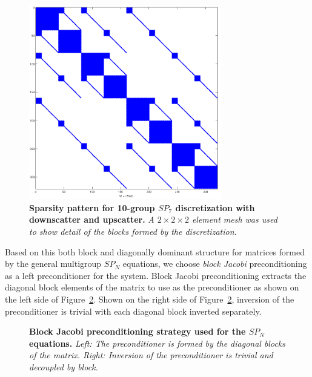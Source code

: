 \begin{figure}[t!]
  \begin{center}
    \includegraphics[width=3.3in]{chapters/spn_equations/group10us.png}
  \end{center}
  \caption{\textbf{Sparsity pattern for 10-group $SP_7$ discretization
      with downscatter and upscatter.} \textit{A $2\times 2 \times 2$ element
      mesh was used to show detail of the blocks formed by the
      discretization.}}
  \label{fig:group10us}
\end{figure}

Based on this both block and diagonally dominant structure for
matrices formed by the general multigroup $SP_N$ equations, we choose
\textit{block Jacobi} preconditioning as a left preconditioner for the
system. Block Jacobi preconditioning extracts the diagonal block
elements of the matrix to use as the preconditioner as shown on the
left side of Figure~\ref{fig:block_jacobi_ex}. Shown on the right side
of Figure~\ref{fig:block_jacobi_ex}, inversion of the preconditioner
is trivial with each diagonal block inverted separately.

\begin{figure}[t!]
  \begin{center}
    \scalebox{1.6}{
     }
  \end{center}
  \caption{\textbf{Block Jacobi preconditioning strategy used for the
      $SP_N$ equations.} \textit{Left: The preconditioner is formed by
      the diagonal blocks of the matrix. Right: Inversion of the
      preconditioner is trivial and decoupled by block.}}
  \label{fig:block_jacobi_ex}
\end{figure}

